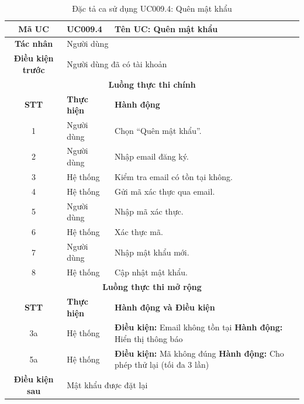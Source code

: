 \begin{table}[H]
    \centering
    \label{tab:uc009-4}
    \begin{tabularx}{\textwidth}{|c|p{3.5cm}|X|}
        \hline
        \rowcolor{headergreen} 
        \textbf{Mã UC} & \textbf{UC009.4} & \textbf{Tên UC: Quên mật khẩu} \\ \hline
        \textbf{Tác nhân} & \multicolumn{2}{l|}{Người dùng} \\ \hline
        \textbf{Điều kiện trước} & \multicolumn{2}{X|}{Người dùng đã có tài khoản} \\ \hline
        
        \multicolumn{3}{|c|}{\cellcolor{headerorange}\textbf{Luồng thực thi chính}} \\ \hline
        \rowcolor{graybg} \textbf{STT} & \textbf{Thực hiện} & \textbf{Hành động} \\ \hline
        1 & Người dùng & Chọn ``Quên mật khẩu''. \\ \hline
        2 & Người dùng & Nhập email đăng ký. \\ \hline
        3 & Hệ thống & Kiểm tra email có tồn tại không. \\ \hline
        4 & Hệ thống & Gửi mã xác thực qua email. \\ \hline
        5 & Người dùng & Nhập mã xác thực. \\ \hline
        6 & Hệ thống & Xác thực mã. \\ \hline
        7 & Người dùng & Nhập mật khẩu mới. \\ \hline
        8 & Hệ thống & Cập nhật mật khẩu. \\ \hline
        
        \multicolumn{3}{|c|}{\cellcolor{headerorange}\textbf{Luồng thực thi mở rộng}} \\ \hline
        \rowcolor{graybg} \textbf{STT} & \textbf{Thực hiện} & \textbf{Hành động và Điều kiện} \\ \hline
        3a & Hệ thống & \textbf{Điều kiện:} Email không tồn tại \newline \textbf{Hành động:} Hiển thị thông báo \\ \hline
        5a & Hệ thống & \textbf{Điều kiện:} Mã không đúng \newline \textbf{Hành động:} Cho phép thử lại (tối đa 3 lần) \\ \hline
        
        \textbf{Điều kiện sau} & \multicolumn{2}{X|}{Mật khẩu được đặt lại} \\ \hline
    \end{tabularx}
    \caption{Đặc tả ca sử dụng UC009.4: Quên mật khẩu}
\end{table}

